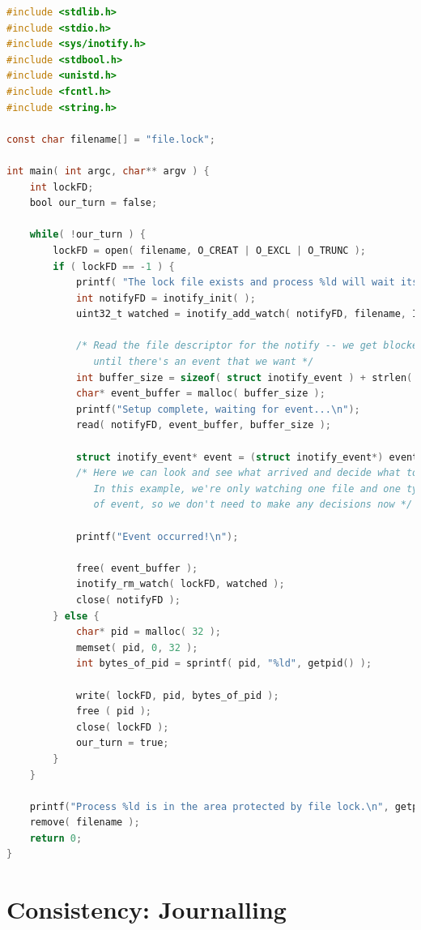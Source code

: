 \documentclass[a4paper]{report}
\begin{document}
\begin{lstlisting}[language=C]
#include <stdlib.h>
#include <stdio.h>
#include <sys/inotify.h>
#include <stdbool.h>
#include <unistd.h>
#include <fcntl.h>
#include <string.h>

const char filename[] = "file.lock";

int main( int argc, char** argv ) {
    int lockFD;
    bool our_turn = false;
    
    while( !our_turn ) {
        lockFD = open( filename, O_CREAT | O_EXCL | O_TRUNC );
        if ( lockFD == -1 ) {
            printf( "The lock file exists and process %ld will wait its turn...\n", getpid() ); 
            int notifyFD = inotify_init( );
            uint32_t watched = inotify_add_watch( notifyFD, filename, IN_DELETE_SELF );
            
            /* Read the file descriptor for the notify -- we get blocked here
               until there's an event that we want */
            int buffer_size = sizeof( struct inotify_event ) + strlen( filename ) + 1;
            char* event_buffer = malloc( buffer_size );
            printf("Setup complete, waiting for event...\n");
            read( notifyFD, event_buffer, buffer_size );

            struct inotify_event* event = (struct inotify_event*) event_buffer;
            /* Here we can look and see what arrived and decide what to do.
               In this example, we're only watching one file and one type
               of event, so we don't need to make any decisions now */

            printf("Event occurred!\n");

            free( event_buffer );
            inotify_rm_watch( lockFD, watched );
            close( notifyFD );
        } else {
            char* pid = malloc( 32 );
            memset( pid, 0, 32 );
            int bytes_of_pid = sprintf( pid, "%ld", getpid() );

            write( lockFD, pid, bytes_of_pid ); 
            free ( pid );
            close( lockFD );
            our_turn = true; 
        }
    } 

    printf("Process %ld is in the area protected by file lock.\n", getpid());
    remove( filename );
    return 0;
}
\end{lstlisting}

\section*{Consistency: Journalling}
\end{document}
